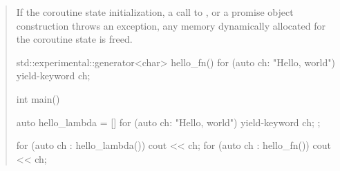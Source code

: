 \begin{quote}
%
%





\pnum
If the coroutine state initialization, a call to , or a promise object construction throws
an exception, 
any memory dynamically allocated 
for the coroutine state is freed.

\pnum
\enterexample
\begin{codeblock}
std::experimental::generator<char> hello_fn() {
  for (auto ch: "Hello, world") yield-keyword ch;
}
  
int main() {
  auto hello_lambda = []{ for (auto ch: "Hello, world") yield-keyword ch; };
  
  for (auto ch : hello_lambda()) 
     cout << ch;
  for (auto ch : hello_fn()) 
     cout << ch;
}
\end{codeblock}
\exitexample


\end{quote}

